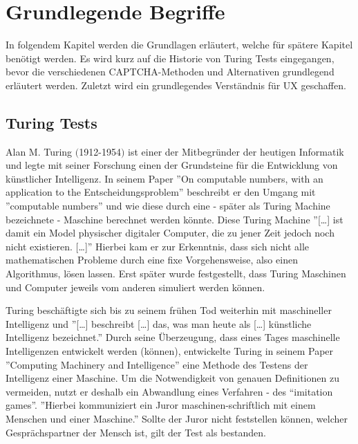 \chapter{Grundlegende Begriffe}
\label{ch:basics}
In folgendem Kapitel werden die Grundlagen erläutert, welche für spätere Kapitel benötigt werden. 
Es wird kurz auf die Historie von Turing Tests eingegangen, 
bevor die verschiedenen CAPTCHA-Methoden und Alternativen grundlegend erläutert werden. 
Zuletzt wird ein grundlegendes Verständnis für UX geschaffen.

\section{Turing Tests}
\label{ch:basics:turing}
Alan M. Turing $($1912-1954$)$ ist einer der Mitbegründer der heutigen Informatik 
und legte mit seiner Forschung einen der Grundsteine für die Entwicklung von künstlicher Intelligenz. 
In seinem Paper ''On computable numbers, with an application to the Entscheidungsproblem'' \cite{turing} 
beschreibt er den Umgang mit ''computable numbers'' und wie diese durch eine - später als Turing Machine bezeichnete - Maschine berechnet werden könnte.
Diese Turing Machine ''[\dots] ist damit ein Model physischer digitaler Computer, die zu jener Zeit jedoch noch nicht existieren. [\dots]'' \cite[p.4]{pallay2020turing}
Hierbei kam er zur Erkenntnis, dass sich nicht alle mathematischen Probleme durch eine fixe Vorgehensweise, also einen Algorithmus, lösen lassen. 
Erst später wurde festgestellt, dass Turing Maschinen und Computer jeweils vom anderen simuliert werden können. \cite[p.647]{geniusofturing} \cite[p.4]{pallay2020turing} %

Turing beschäftigte sich bis zu seinem frühen Tod weiterhin mit maschineller Intelligenz 
und ''[\dots] beschreibt [\dots] das, was man heute als [\dots] künstliche Intelligenz bezeichnet.'' \cite[p.10]{pallay2020turing}
Durch seine Überzeugung, dass eines Tages maschinelle Intelligenzen entwickelt werden (können), 
entwickelte Turing in seinem Paper ''Computing Machinery and Intelligence'' \cite[p.23ff]{turing2009computing} 
eine Methode des Testens der Intelligenz einer Maschine. 
Um die Notwendigkeit von genauen Definitionen zu vermeiden, nutzt er deshalb ein Abwandlung eines Verfahren - des ``imitation games''. 
''Hierbei kommuniziert ein Juror maschinen-schriftlich mit einem Menschen und einer Maschine.'' \cite[p.12]{pallay2020turing}
Sollte der Juror nicht feststellen können, welcher Gesprächspartner der Mensch ist, gilt der Test als bestanden. \cite[p.11ff]{pallay2020turing}

